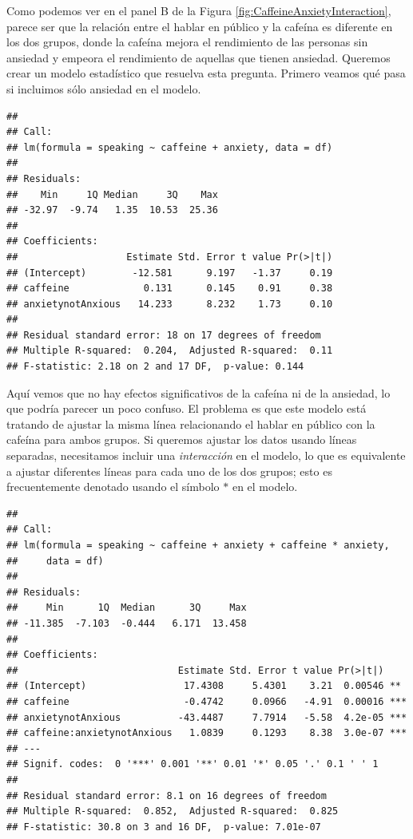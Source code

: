 \documentclass[
  12pt,
]{book}
\begin{document}
Como podemos ver en el panel B de la Figura \ref{fig:CaffeineAnxietyInteraction}, parece ser que la relación entre el hablar en público y la cafeína es diferente en los dos grupos, donde la cafeína mejora el rendimiento de las personas sin ansiedad y empeora el rendimiento de aquellas que tienen ansiedad. Queremos crear un modelo estadístico que resuelva esta pregunta. Primero veamos qué pasa si incluimos sólo ansiedad en el modelo.

\begin{verbatim}
## 
## Call:
## lm(formula = speaking ~ caffeine + anxiety, data = df)
## 
## Residuals:
##    Min     1Q Median     3Q    Max 
## -32.97  -9.74   1.35  10.53  25.36 
## 
## Coefficients:
##                   Estimate Std. Error t value Pr(>|t|)
## (Intercept)        -12.581      9.197   -1.37     0.19
## caffeine             0.131      0.145    0.91     0.38
## anxietynotAnxious   14.233      8.232    1.73     0.10
## 
## Residual standard error: 18 on 17 degrees of freedom
## Multiple R-squared:  0.204,	Adjusted R-squared:  0.11 
## F-statistic: 2.18 on 2 and 17 DF,  p-value: 0.144
\end{verbatim}

Aquí vemos que no hay efectos significativos de la cafeína ni de la ansiedad, lo que podría parecer un poco confuso. El problema es que este modelo está tratando de ajustar la misma línea relacionando el hablar en público con la cafeína para ambos grupos. Si queremos ajustar los datos usando líneas separadas, necesitamos incluir una \emph{interacción} en el modelo, lo que es equivalente a ajustar diferentes líneas para cada uno de los dos grupos; esto es frecuentemente denotado usando el símbolo \(*\) en el modelo.

\begin{verbatim}
## 
## Call:
## lm(formula = speaking ~ caffeine + anxiety + caffeine * anxiety, 
##     data = df)
## 
## Residuals:
##     Min      1Q  Median      3Q     Max 
## -11.385  -7.103  -0.444   6.171  13.458 
## 
## Coefficients:
##                            Estimate Std. Error t value Pr(>|t|)    
## (Intercept)                 17.4308     5.4301    3.21  0.00546 ** 
## caffeine                    -0.4742     0.0966   -4.91  0.00016 ***
## anxietynotAnxious          -43.4487     7.7914   -5.58  4.2e-05 ***
## caffeine:anxietynotAnxious   1.0839     0.1293    8.38  3.0e-07 ***
## ---
## Signif. codes:  0 '***' 0.001 '**' 0.01 '*' 0.05 '.' 0.1 ' ' 1
## 
## Residual standard error: 8.1 on 16 degrees of freedom
## Multiple R-squared:  0.852,	Adjusted R-squared:  0.825 
## F-statistic: 30.8 on 3 and 16 DF,  p-value: 7.01e-07
\end{verbatim}
\end{document}
